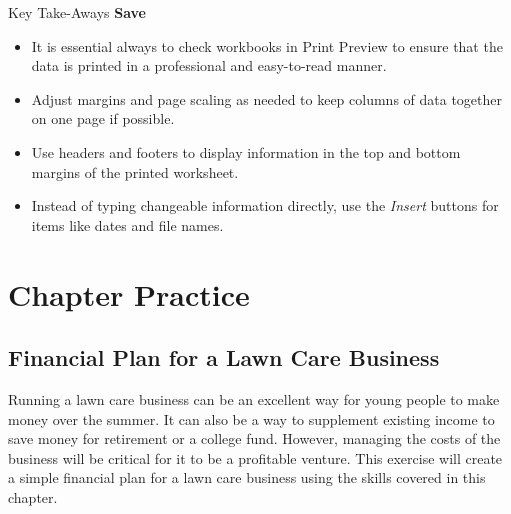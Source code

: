 \begin{center}
	\begin{tkwbox}{Key Take-Aways}
		\textbf{Save}
		\\
		\begin{itemize}
			\setlength{\itemsep}{0pt}
			\setlength{\parskip}{0pt}
			\setlength{\parsep}{0pt}
			
			\item It is essential always to check workbooks in Print Preview to ensure that the data is printed in a professional and easy-to-read manner.
			\item Adjust margins and page scaling as needed to keep columns of data together on one page if possible.
			\item Use headers and footers to display information in the top and bottom margins of the printed worksheet.
			\item Instead of typing changeable information directly, use the \textit{Insert} buttons for items like dates and file names.
			
		\end{itemize}
	\end{tkwbox}
\end{center}

\section{Chapter Practice}

\subsection{Financial Plan for a Lawn Care Business}

Running a lawn care business can be an excellent way for young people to make money over the summer. It can also be a way to supplement existing income to save money for retirement or a college fund. However, managing the costs of the business will be critical for it to be a profitable venture. This exercise will create a simple financial plan for a lawn care business using the skills covered in this chapter.

